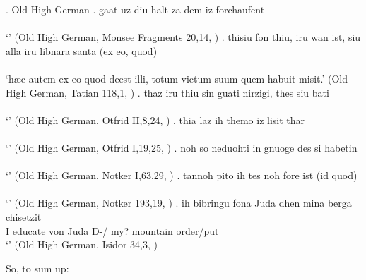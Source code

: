 \ex. Old High German
\ag. gaat uz diu halt za dem iz forchaufent\\
 \\
 `' \hfill (Old High German, Monsee Fragments 20,14, \citealt[761]{behaghel1923})
\bg. thisiu fon thiu, iru wan ist, siu alla iru libnara santa (ex eo, quod)\\
 \\
 `hæc autem ex eo quod deest illi, totum victum suum quem habuit misit.' \hfill (Old High German, Tatian 118,1, \citealt[761]{behaghel1923})
\bg. thaz iru thiu sin guati nirzigi, thes siu bati\\
 \\
 `' \hfill (Old High German, Otfrid II,8,24, \citealt[761]{behaghel1923})
\bg. thia laz ih themo iz lisit thar\\
 \\
 `' \hfill (Old High German, Otfrid I,19,25, \citealt[761]{behaghel1923})
\bg. noh so neduohti in gnuoge des si habetin\\
 \\
 `' \hfill (Old High German, Notker I,63,29, \citealt[761]{behaghel1923})
\bg. tannoh pito ih tes noh fore ist (id quod)\\
 \\
 `' \hfill (Old High German, Notker 193,19, \citealt[761]{behaghel1923})
\bg. ih bibringu fona Juda dhen mina berga chisetzit\\
  I educate von Juda D-/ my? mountain order/put\\
  `' \hfill (Old High German, Isidor 34,3, \citealt[761]{behaghel1923})

So, to sum up:

